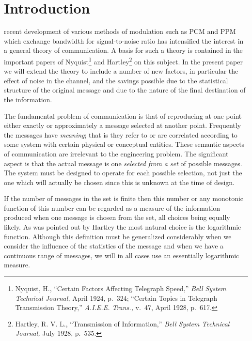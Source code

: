 \section*{Introduction}

 recent development of various methods of modulation
such as PCM and PPM which exchange bandwidth for signal-to-noise ratio
has intensified the interest in a general theory of communication.
A basis for such a theory is contained in the important papers of
Nyquist\footnote{Nyquist, H., ``Certain Factors Affecting Telegraph
Speed,'' {\it Bell System Technical Journal,} April 1924, p.~324; ``Certain
Topics in Telegraph Transmission Theory,'' {\it A.I.E.E. Trans.,} v.~47,
April 1928, p.~617.} and Hartley\footnote{Hartley, R. V. L., ``Transmission
of Information,'' {\it Bell System Technical Journal,} July 1928, p.~535.}
on this subject.  In the present paper we will extend the theory to include
a number of new factors, in particular the effect of noise in the channel,
and the savings possible due to the statistical structure of the original
message and due to the nature of the final destination of the information.

The fundamental problem of communication is that of reproducing at one
point either exactly or approximately a message selected at another point.
Frequently the messages have \emph{meaning}; that is they refer to or are
correlated according to some system with certain physical or conceptual
entities.  These semantic aspects of communication are irrelevant to the
engineering problem.  The significant aspect is that the actual message is
one \emph{selected from a set} of possible messages.  The system must be
designed to operate for each possible selection, not just the one which
will actually be chosen since this is unknown at the time of design.

If the number of messages in the set is finite then this number or any
monotonic function of this number can be regarded as a measure of the
information produced when one message is chosen from the set, all choices
being equally likely.  As was pointed out by Hartley the most natural
choice is the logarithmic function.  Although this definition must be
generalized considerably when we consider the influence of the statistics
of the message and when we have a continuous range of messages, we will in
all cases use an essentially logarithmic measure.

